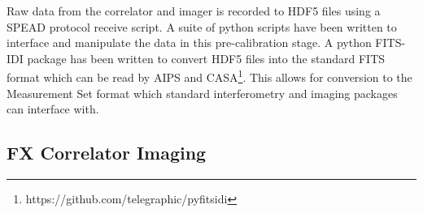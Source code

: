 \documentclass[useAMS,macros,usenatbib]{mn2e}
\begin{document}
Raw data from the correlator and imager is recorded to HDF5 files using a SPEAD protocol receive script.
A suite of python scripts have been written to interface and manipulate the data in this pre-calibration stage.
A python FITS-IDI package has been written to convert HDF5 files into the standard FITS format which can be read by AIPS and CASA\footnote{https://github.com/telegraphic/pyfitsidi}.
This allows for conversion to the Measurement Set format which standard interferometry and imaging packages can interface with.

\subsection{FX Correlator Imaging}
\label{fx_results}



\end{document}
